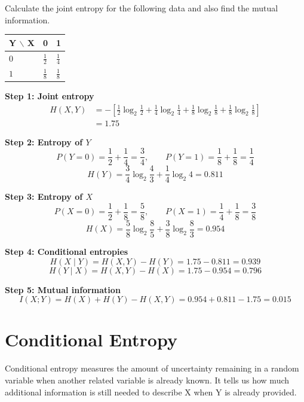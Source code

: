 \documentclass[11pt,a4paper]{book}
\renewcommand{\arraystretch}{1.4}
\newenvironment{definitionbox}[1][Definition]{%
    \begin{tcolorbox}[
        enhanced,
        breakable,
        colback=primaryblue!10,
        colframe=primaryblue!150,
        title=#1,
        fonttitle=\bfseries,
        sharp corners,
        boxrule=0.8pt,
        left=8pt,
        right=8pt,
        top=6pt,
        bottom=6pt
    ]
}{\end{tcolorbox}}
\newcounter{qna}[chapter]
\renewcommand{\theqna}{\thechapter.\arabic{qna}}
\newenvironment{questionanswerbox}[1][Example]{%
    \refstepcounter{qna}
    \begin{tcolorbox}[
        enhanced,
        breakable,
        colback=softlavender!10,
        colframe=softlavender!200,
        title={#1~\theqna},
        fonttitle=\bfseries,
        coltitle=white,
        colbacktitle=softlavender!200,
        sharp corners,
        boxrule=1pt,
        left=8pt,
        right=8pt,
        top=6pt,
        bottom=6pt
    ]
}{\end{tcolorbox}}
\begin{document}
\begin{questionanswerbox}[Example]
Calculate the joint entropy for the following data and also find the mutual information.

\renewcommand{\arraystretch}{1.8}
\setlength{\tabcolsep}{8pt}
\begin{center}
\begin{tabular}{|C{3.4cm}|C{2.4cm}|C{2.4cm}|}
    \hline
    \textbf{Y $\backslash$ X} & 0 & 1 \\ \hline
    $0$ & $\frac{1}{2}$ & $\frac{1}{4}$ \\ \hline
    $1$ & $\frac{1}{8}$ & $\frac{1}{8}$ \\ \hline
\end{tabular}
\end{center}

\textbf{Step 1: Joint entropy}
\begin{align*}
H(X,Y) &= -\left[\frac{1}{2}\log_2\frac{1}{2} + \frac{1}{4}\log_2\frac{1}{4}
+ \frac{1}{8}\log_2\frac{1}{8} + \frac{1}{8}\log_2\frac{1}{8}\right] \\
&= 1.75
\end{align*}

\textbf{Step 2: Entropy of $Y$}
\[
P(Y=0) = \frac{1}{2} + \frac{1}{4} = \frac{3}{4}, \qquad
P(Y=1) = \frac{1}{8} + \frac{1}{8} = \frac{1}{4}
\]
\[
H(Y) = \frac{3}{4}\log_2\frac{4}{3} + \frac{1}{4}\log_2 4 = 0.811
\]

\textbf{Step 3: Entropy of $X$}
\[
P(X=0) = \frac{1}{2} + \frac{1}{8} = \frac{5}{8}, \qquad
P(X=1) = \frac{1}{4} + \frac{1}{8} = \frac{3}{8}
\]
\[
H(X) = \frac{5}{8}\log_2\frac{8}{5} + \frac{3}{8}\log_2\frac{8}{3} = 0.954
\]

\textbf{Step 4: Conditional entropies}
\[
H(X \mid Y) = H(X,Y) - H(Y) = 1.75 - 0.811 = 0.939
\]
\[
H(Y \mid X) = H(X,Y) - H(X) = 1.75 - 0.954 = 0.796
\]

\textbf{Step 5: Mutual information}
\[
I(X;Y) = H(X) + H(Y) - H(X,Y) = 0.954 + 0.811 - 1.75 = 0.015
\]
\end{questionanswerbox}

\clearpage

\section{Conditional Entropy}

\begin{definitionbox}[Conditional Entropy]
Conditional entropy measures the amount of uncertainty remaining in a random variable when another related variable is already known. It tells us how much additional information is still needed to describe X when Y is already provided.
\end{definitionbox}
\end{document}
